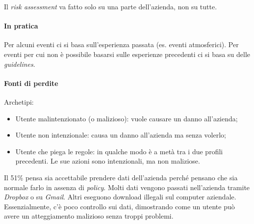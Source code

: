 Il \textit{risk assessment} va fatto solo su una parte dell'azienda, non su
tutte.

\paragraph*{In pratica}

Per alcuni eventi ci si basa sull'esperienza passata (es. eventi atmosferici).
Per eventi per cui non è possibile basarsi sulle esperienze precedenti ci si
basa su delle \textit{guidelines}.

\paragraph*{Fonti di perdite}

Archetipi:
\begin{itemize}
\item Utente malintenzionato (o malizioso): vuole causare un danno all'azienda;
\item Utente non intenzionale: causa un danno all'azienda ma senza volerlo;
\item Utente che piega le regole: in qualche modo è a metà tra i due profili
precedenti. Le sue azioni sono intenzionali, ma non maliziose.
\end{itemize}

Il 51\% pensa sia accettabile prendere dati dell'azienda perché pensano che sia
normale farlo in assenza di \textit{policy}. Molti dati vengono passati
nell'azienda tramite \textit{Dropbox} o su \textit{Gmail}. Altri eseguono
download illegali sul computer aziendale. Essenzialmente, c'è poco controllo 
sui dati, dimostrando come un utente può avere un atteggiamento malizioso senza
troppi problemi.
